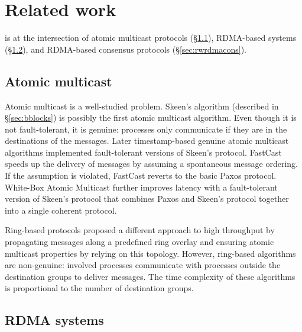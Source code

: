 \section{Related work}
\label{sec:related-work}

\libname is at the intersection of atomic multicast protocols (\S\ref{sec:rwamcast}), 
RDMA-based systems (\S\ref{sec:rwrdmasys}), and RDMA-based consensus protocols (\S\ref{sec:rwrdmacons}).


\subsection{Atomic multicast}
\label{sec:rwamcast}

Atomic multicast is a well-studied problem. Skeen's algorithm (described in \S\ref{sec:bblocks}) is possibly the first atomic multicast algorithm.
Even though it is not fault-tolerant, it
is genuine: processes only communicate if they are in the destinations of the messages. 
Later timestamp-based genuine atomic multicast algorithms 
implemented fault-tolerant versions of Skeen's protocol. FastCast
\cite{Coelho2017} speeds up the delivery of messages by assuming a
spontaneous message ordering. If the
assumption is violated, FastCast reverts to the basic Paxos protocol. White-Box Atomic Multicast \cite{gotsman2019white} further improves 
latency with a fault-tolerant version of Skeen's protocol that combines Paxos and
Skeen's protocol together into a single coherent protocol.

Ring-based protocols \cite{delporte2000fault, bezerra2015ridge,
marandi2012multi} proposed a different approach to high throughput by
propagating messages along a predefined ring overlay and ensuring atomic multicast
properties by relying on this topology. However, ring-based algorithms are
non-genuine: involved processes communicate with processes outside the
destination groups to deliver messages. The time complexity of these algorithms is
proportional to the number of destination groups.

\subsection{RDMA systems}
\label{sec:rwrdmasys}

